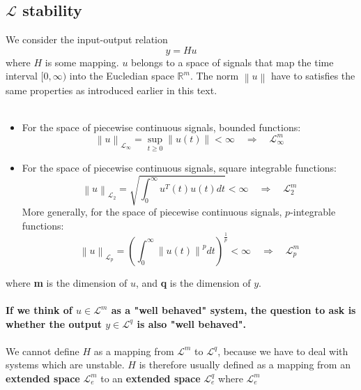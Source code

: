 \documentclass{article}
\begin{document}
\subsection{$\mathcal{L}$ stability}
We consider the input-output relation
\begin{equation}
	y = H u
	\label{eqn: i-o-relation}
\end{equation}
where $H$ is some mapping. $u$ belongs to a space of signals that map the time interval $[0, \infty )$ into the Eucledian space $\mathbb{R}^m$. The norm $\left\| u \right\| $ have to satisfies the same properties as introduced earlier in this text.
\\\\
\begin{itemize}
	\item For the space of piecewise continuous signals, bounded functions:
	      \begin{equation}
		      \left\| u \right\| _{\mathcal{L}_\infty } = \sup_{t \geq 0} \left\| u(t) \right\| < \infty \quad \Rightarrow  \quad \mathcal{L}^m_\infty
	      \end{equation}
	\item For the space of piecewise continuous signals, square integrable functions:
	      \begin{equation}
		      \left\| u \right\|_{\mathcal{L}_2} = \sqrt{\int_{0}^{\infty} u^T(t) u(t) dt} < \infty \quad \Rightarrow  \quad \mathcal{L}^m_2
	      \end{equation}
	      More generally, for the space of piecewise continuous signals, $p$-integrable functions:
	      \begin{equation}
		      \left\| u \right\|_{\mathcal{L}_p} = \left( \int_{0}^{\infty} \left\| u(t) \right\|^p dt \right)^{\frac{1}{p}} < \infty \quad \Rightarrow  \quad \mathcal{L}^m_p
	      \end{equation}
\end{itemize}
where \textbf{m} is the dimension of $u$, and \textbf{q} is the dimension of $y$.
\\\\
\textbf{If we think of $u \in  \mathcal{L}^m$ as a "well behaved" system, the question to ask is whether the output $y \in \mathcal{L}^q$ is also "well behaved".}
\\\\
We cannot define $H$ as a mapping from $\mathcal{L}^m$ to $\mathcal{L}^q$, because we have to deal with systems which are unstable. $H$ is therefore usually defined as a mapping from an \textbf{extended space} $\mathcal{L}_e^m$ to an \textbf{extended space} $\mathcal{L}_e^q$ where $\mathcal{L}_e^m$
\end{document}
